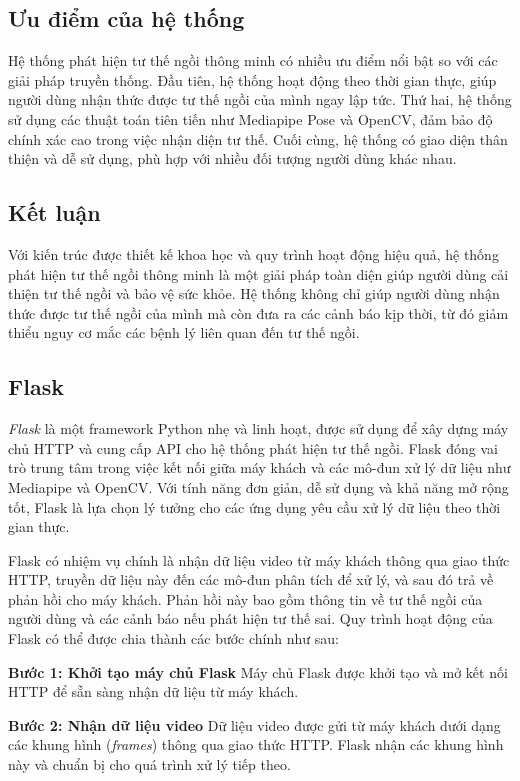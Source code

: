 \documentclass[conference]{IEEEtran}
\begin{document}
\subsection{Ưu điểm của hệ thống}
Hệ thống phát hiện tư thế ngồi thông minh có nhiều ưu điểm nổi bật so với các giải pháp truyền thống. Đầu tiên, hệ thống hoạt động theo thời gian thực, giúp người dùng nhận thức được tư thế ngồi của mình ngay lập tức. Thứ hai, hệ thống sử dụng các thuật toán tiên tiến như Mediapipe Pose và OpenCV, đảm bảo độ chính xác cao trong việc nhận diện tư thế. Cuối cùng, hệ thống có giao diện thân thiện và dễ sử dụng, phù hợp với nhiều đối tượng người dùng khác nhau.

\subsection{Kết luận}
Với kiến trúc được thiết kế khoa học và quy trình hoạt động hiệu quả, hệ thống phát hiện tư thế ngồi thông minh là một giải pháp toàn diện giúp người dùng cải thiện tư thế ngồi và bảo vệ sức khỏe. Hệ thống không chỉ giúp người dùng nhận thức được tư thế ngồi của mình mà còn đưa ra các cảnh báo kịp thời, từ đó giảm thiểu nguy cơ mắc các bệnh lý liên quan đến tư thế ngồi.

\subsection{Flask}
\textit{Flask} là một framework Python nhẹ và linh hoạt, được sử dụng để xây dựng máy chủ HTTP và cung cấp API cho hệ thống phát hiện tư thế ngồi. Flask đóng vai trò trung tâm trong việc kết nối giữa máy khách và các mô-đun xử lý dữ liệu như Mediapipe và OpenCV. Với tính năng đơn giản, dễ sử dụng và khả năng mở rộng tốt, Flask là lựa chọn lý tưởng cho các ứng dụng yêu cầu xử lý dữ liệu theo thời gian thực.

Flask có nhiệm vụ chính là nhận dữ liệu video từ máy khách thông qua giao thức HTTP, truyền dữ liệu này đến các mô-đun phân tích để xử lý, và sau đó trả về phản hồi cho máy khách. Phản hồi này bao gồm thông tin về tư thế ngồi của người dùng và các cảnh báo nếu phát hiện tư thế sai. Quy trình hoạt động của Flask có thể được chia thành các bước chính như sau:

\textbf{Bước 1: Khởi tạo máy chủ Flask}  
    Máy chủ Flask được khởi tạo và mở kết nối HTTP để sẵn sàng nhận dữ liệu từ máy khách.
    
 \textbf{Bước 2: Nhận dữ liệu video}  
    Dữ liệu video được gửi từ máy khách dưới dạng các khung hình (\textit{frames}) thông qua giao thức HTTP. Flask nhận các khung hình này và chuẩn bị cho quá trình xử lý tiếp theo.
    
\end{document}
